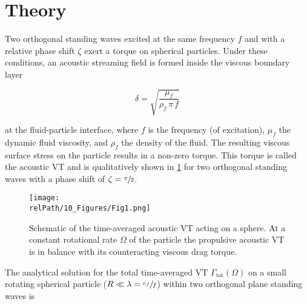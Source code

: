 \section{Theory \label{sec:VT-theory}}

Two orthogonal standing waves excited at the same frequency $f$ and with a 
relative phase shift $\zeta$ exert a torque on spherical particles. Under these 
conditions, an acoustic streaming field is formed inside the viscous boundary 
layer

\begin{equation}
    \delta = \sqrt{\frac{\mu_{f}}{\rho_{f}\,\pi\,f}}
    \label{eq:VT-delta}
\end{equation}

at the fluid-particle interface, where $f$ is the frequency (of excitation), 
$\mu_{f}$ the dynamic fluid viscosity, and $\rho_{f}$ the density of the fluid. 
The resulting viscous surface stress on the particle results in a non-zero 
torque. This torque is called the acoustic VT and is qualitatively shown in 
\cref{fig:VT-VT-Fig1} for two orthogonal standing waves with a phase shift of 
$\zeta = \sfrac{\pi}{2}$.

\begin{figure}
    \centering
    \texttt{[image: \\relPath/10\_Figures/Fig1.png]}
    \caption{Schematic of the time-averaged acoustic VT acting on a sphere. At a 
    constant rotational rate $\Omega$ of the particle the propulsive acoustic 
  VT is in balance with its counteracting viscous drag 
torque.\label{fig:VT-VT-Fig1}}
\end{figure}%

The analytical solution for the total time-averaged VT 
$\Gamma_{\text{tot}}(\Omega)$ on a small rotating spherical particle 
($R\ll\lambda=\sfrac{c_f}{f}$) within two orthogonal plane standing waves is 

